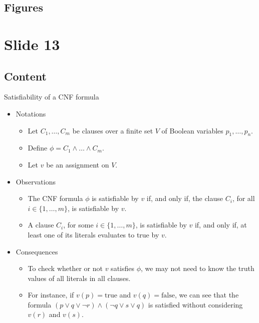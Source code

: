 \documentclass{article}%
\begin{document}
\subsection{Figures}%
\begin{figure}[H]%
\centering%
\end{figure}

%
\newpage%
\section{Slide 13}%
\label{sec:Slide13}%
\subsection{Content}%

Satisfiability of a CNF formula
\begin{itemize}
    \item Notations
    \begin{itemize}
        \item Let $C_1, \dots, C_m$ be clauses over a finite set $V$ of Boolean variables $p_1, \dots, p_n$.
        \item Define $\phi = C_1 \land \dots \land C_m$.
        \item Let $v$ be an assignment on $V$.
    \end{itemize}
    \item Observations
    \begin{itemize}
        \item The CNF formula $\phi$ is satisfiable by $v$ if, and only if, the clause $C_i$, for all $i \in \{1, \dots, m\}$, is satisfiable by $v$.
        \item A clause $C_i$, for some $i \in \{1, \dots, m\}$, is satisfiable by $v$ if, and only if, at least one of its literals evaluates to true by $v$.
    \end{itemize}
    \item Consequences
    \begin{itemize}
        \item To check whether or not $v$ satisfies $\phi$, we may not need to know the truth values of all literals in all clauses.
        \item For instance, if $v(p) = \text{true}$ and $v(q) = \text{false}$, we can see that the formula $(p \lor q \lor \neg r) \land (\neg q \lor s \lor q)$ is satisfied without considering $v(r)$ and $v(s)$.
    \end{itemize}
\end{itemize}
%
\end{document}
